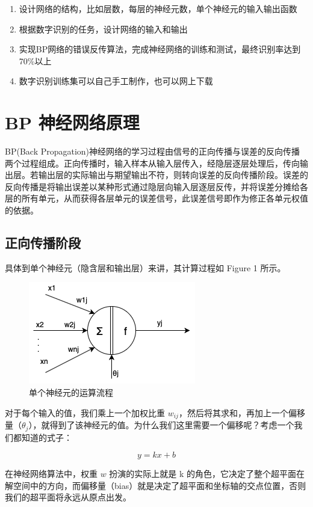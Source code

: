 \begin{enumerate}
    \item 设计网络的结构，比如层数，每层的神经元数，单个神经元的输入输出函数
    \item 根据数字识别的任务，设计网络的输入和输出
    \item 实现BP网络的错误反传算法，完成神经网络的训练和测试，最终识别率达到70\%以上
    \item 数字识别训练集可以自己手工制作，也可以网上下载
\end{enumerate}

\section{BP 神经网络原理}

BP(Back Propagation)神经网络的学习过程由信号的正向传播与误差的反向传播两个过程组成。正向传播时，输入样本从输入层传入，经隐层逐层处理后，传向输出层。若输出层的实际输出与期望输出不符，则转向误差的反向传播阶段。误差的反向传播是将输出误差以某种形式通过隐层向输入层逐层反传，并将误差分摊给各层的所有单元，从而获得各层单元的误差信号，此误差信号即作为修正各单元权值的依据。

\subsection{正向传播阶段}

具体到单个神经元（隐含层和输出层）来讲，其计算过程如 Figure 1 所示。

\begin{figure}
    \centering
    \includegraphics{single.png}
    \caption{单个神经元的运算流程}
    \label{fig:single}
\end{figure}

对于每个输入的值，我们乘上一个加权比重 $w_{ij}$，然后将其求和，再加上一个偏移量（$\theta_j$），就得到了该神经元的值。为什么我们这里需要一个偏移呢？考虑一个我们都知道的式子：

$$y = kx + b$$

在神经网络算法中，权重 $w$ 扮演的实际上就是 k 的角色，它决定了整个超平面在解空间中的方向，而偏移量（bias）就是决定了超平面和坐标轴的交点位置，否则我们的超平面将永远从原点出发。

